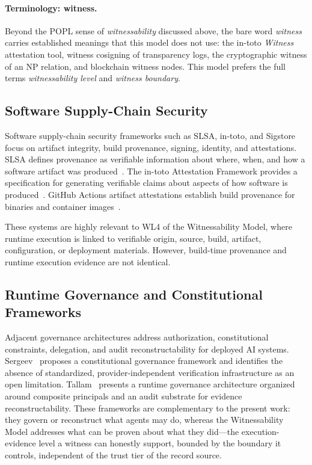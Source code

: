 \documentclass[11pt]{article}
\begin{document}
\paragraph{Terminology: witness.} Beyond the POPL sense of \emph{witnessability} discussed above, the bare word \emph{witness} carries established meanings that this model does not use: the in-toto \emph{Witness} attestation tool, witness cosigning of transparency logs, the cryptographic witness of an NP relation, and blockchain witness nodes. This model prefers the full terms \emph{witnessability level} and \emph{witness boundary}.

\subsection{Software Supply-Chain Security}
Software supply-chain security frameworks such as SLSA, in-toto, and Sigstore focus on artifact integrity, build provenance, signing, identity, and attestations. SLSA defines provenance as verifiable information about where, when, and how a software artifact was produced~\cite{slsa_provenance,slsa_verifying_artifacts}. The in-toto Attestation Framework provides a specification for generating verifiable claims about aspects of how software is produced~\cite{intoto_attestation,intoto_slsa_blog}. GitHub Actions artifact attestations establish build provenance for binaries and container images~\cite{github_actions_attestations,github_actions_attest_concepts}.

These systems are highly relevant to WL4 of the Witnessability Model, where runtime execution is linked to verifiable origin, source, build, artifact, configuration, or deployment materials. However, build-time provenance and runtime execution evidence are not identical.

\subsection{Runtime Governance and Constitutional Frameworks}
Adjacent governance architectures address authorization, constitutional constraints, delegation, and audit reconstructability for deployed AI systems. Sergeev~\cite{sergeev_pai_cd_2026} proposes a constitutional governance framework and identifies the absence of standardized, provider-independent verification infrastructure as an open limitation. Tallam~\cite{tallam_five_plane_2026} presents a runtime governance architecture organized around composite principals and an audit substrate for evidence reconstructability. These frameworks are complementary to the present work: they govern or reconstruct what agents may do, whereas the Witnessability Model addresses what can be proven about what they did---the execution-evidence level a witness can honestly support, bounded by the boundary it controls, independent of the trust tier of the record source.
\end{document}
